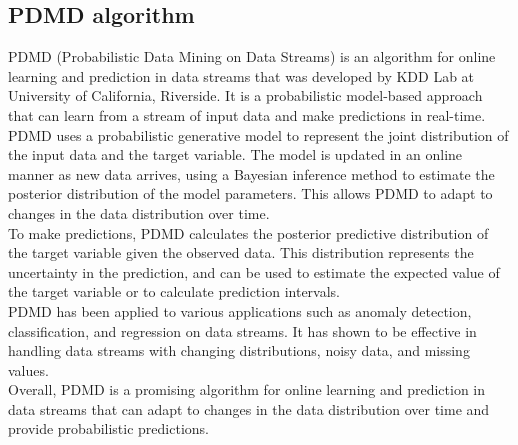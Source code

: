         \subsection{PDMD algorithm} 
        PDMD (Probabilistic Data Mining on Data Streams) is an algorithm for online learning and prediction in data streams that was
        developed by KDD Lab at University of California, Riverside. It is a probabilistic model-based approach that can learn from a stream of input
        data and make predictions in real-time.
        \\
        PDMD uses a probabilistic generative model to represent the joint distribution of the input data and the target variable.
        The model is updated in an online manner as new data arrives, using a Bayesian inference method to estimate the posterior
        distribution of the model parameters. This allows PDMD to adapt to changes in the data distribution over time.
        \\
        To make predictions, PDMD calculates the posterior predictive distribution of the target variable given the observed data.
        This distribution represents the uncertainty in the prediction, and can be used to estimate the expected value of the target
        variable or to calculate prediction intervals.
        \\
        PDMD has been applied to various applications such as anomaly detection, classification, and regression on data streams.
        It has shown to be effective in handling data streams with changing distributions, noisy data, and missing values.
        \\
        Overall, PDMD is a promising algorithm for online learning and prediction in data streams that can adapt to changes in the data distribution
        over time and provide probabilistic predictions.
